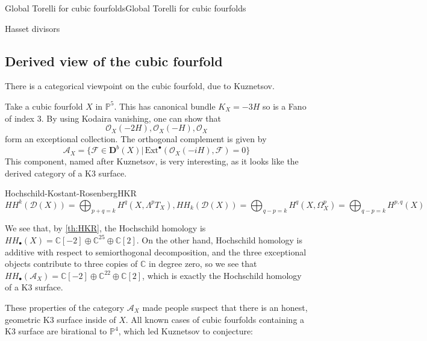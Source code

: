 \begin{theorem}{Global Torelli for cubic fourfolds}{Global Torelli for cubic fourfolds}
    
\end{theorem}

\begin{theorem}{Hasset divisors}{}

\end{theorem}

\subsection{Derived view of the cubic fourfold}

There is a categorical viewpoint on the cubic fourfold, due to Kuznetsov.

Take a cubic fourfold $X$ in $\mathbb{P}^5$. This has canonical bundle $K_{X}=-3H$ so is a Fano of index 3. By using Kodaira vanishing, one can show that $$\mathcal{O}_{X}(-2H), \mathcal{O}_{X}(-H), \mathcal{O}_{X}$$form an exceptional collection. The orthogonal complement is given by $$\mathcal{A}_{X}=\{\mathcal{F}\in \mathbf{D}^b(X)|\,\mathrm{Ext}^\bullet(\mathcal{O}_{X}(-iH), \mathcal{F})=0\}$$This component, named after Kuznetsov, is very interesting, as it looks like the derived category of a K3 surface.

\begin{theorem}{Hochschild-Kostant-Rosenberg}{HKR}
    $$HH^k(\mathcal{D}(X))=\bigoplus_{p+q=k} H^q(X, \Lambda^p T_X), HH_k(\mathcal{D}(X))=\bigoplus_{q-p=k} H^q(X, \Omega^p_X)=\bigoplus_{q-p=k} H^{p,q}(X)$$
    
\end{theorem}

We see that, by \ref{th:HKR}, the Hochschild homology is $HH_\bullet(X)=\mathbb{C}[-2]\oplus \mathbb{C}^{25}\oplus \mathbb{C}[2]$. On the other hand, Hochschild homology is additive with respect to semiorthogonal decomposition, and the three exceptional objects contribute to three copies of $\mathbb{C}$ in degree zero, so we see that $HH_\bullet(\mathcal{A}_X)=\mathbb{C}[-2]\oplus \mathbb{C}^{22}\oplus \mathbb{C}[2]$, which is exactly the Hochschild homology of a K3 surface.

These properties of the category $\mathcal{A}_X$ made people suspect that there is an honest, geometric K3 surface inside of $X$. All known cases of cubic fourfolds containing a K3 surface are birational to $\mathbb{P}^4$, which led Kuznetsov to conjecture:

